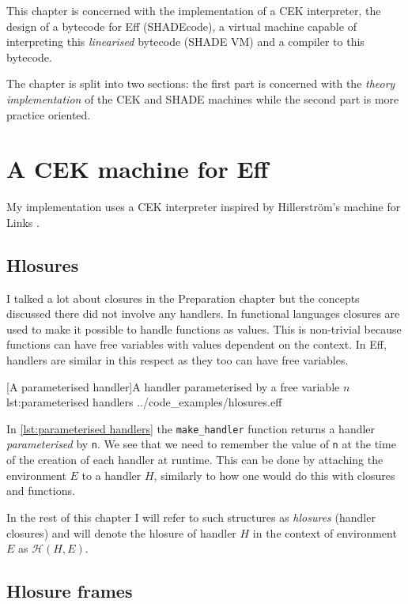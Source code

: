 \documentclass[class=article, crop=false]{standalone}
\begin{document}
This chapter is concerned with the implementation of a CEK interpreter, the
design of a bytecode for Eff (SHADEcode), a virtual machine capable of
interpreting this \emph{linearised} bytecode (SHADE VM) and a compiler to this
bytecode.

The chapter is split into two sections: the first part is concerned with the
\emph{theory implementation} of the CEK and SHADE machines while the second part
is more practice oriented.

\section{A CEK machine for Eff}

My implementation uses a CEK interpreter inspired by Hillerström's
machine for Links \cite{hillerstrom2016compilation}.

\subsection{Hlosures}

I talked a lot about closures in the Preparation chapter but the concepts
discussed there did not involve any handlers. In functional languages closures
are used to make it possible to handle functions as values. This is non-trivial
because functions can have free variables with values 
dependent on the context. In Eff, handlers are similar in this respect
as they too can have free variables.

{[A parameterised handler]A handler parameterised by a free variable $n$}
{lst:parameterised handlers}
{../code_examples/hlosures.eff}

In \autoref{lst:parameterised handlers} the \lstinline|make_handler| function
returns a handler \emph{parameterised} by \lstinline|n|. We see that we need to
remember the value of \verb|n| at the time of the creation of each handler
at runtime. This can be done by attaching the environment $E$ to a handler $H$,
similarly to how one would do this with closures and functions.

In the rest of this chapter I will refer to such structures as \emph{hlosures}
(handler closures) and will denote the hlosure of handler $H$ in the context of
environment $E$ as $\mathcal{H}(H, E)$.

\subsection{Hlosure frames}
\end{document}
